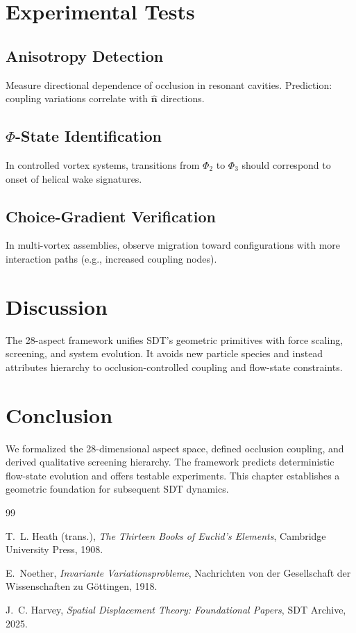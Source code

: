 \section{Experimental Tests}

\subsection{Anisotropy Detection}
Measure directional dependence of occlusion in resonant cavities. Prediction: coupling variations correlate with $\hat{\mathbf{n}}$ directions.

\subsection{$\Phi$-State Identification}
In controlled vortex systems, transitions from $\Phi_2$ to $\Phi_3$ should correspond to onset of helical wake signatures.

\subsection{Choice-Gradient Verification}
In multi-vortex assemblies, observe migration toward configurations with more interaction paths (e.g., increased coupling nodes).

\section{Discussion}
The 28-aspect framework unifies SDT’s geometric primitives with force scaling, screening, and system evolution. It avoids new particle species and instead attributes hierarchy to occlusion-controlled coupling and flow-state constraints.

\section{Conclusion}
We formalized the 28-dimensional aspect space, defined occlusion coupling, and derived qualitative screening hierarchy. The framework predicts deterministic flow-state evolution and offers testable experiments. This chapter establishes a geometric foundation for subsequent SDT dynamics.




\begin{thebibliography}{99}

T.~L. Heath (trans.), \emph{The Thirteen Books of Euclid's Elements}, Cambridge University Press, 1908.

E.~Noether, \emph{Invariante Variationsprobleme}, Nachrichten von der Gesellschaft der Wissenschaften zu G\"ottingen, 1918.

J.~C. Harvey, \emph{Spatial Displacement Theory: Foundational Papers}, SDT Archive, 2025.

\end{thebibliography}


